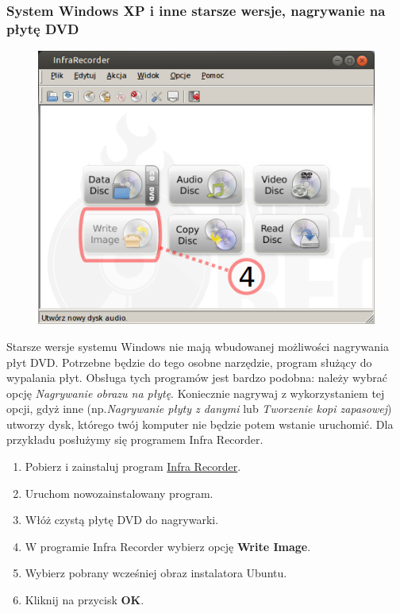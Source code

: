 \subsubsection{System Windows XP i inne starsze wersje, nagrywanie na płytę DVD}
\begin{figure}
		\includegraphics[width=\linewidth]{images/instalacja_nagrywanie_obrazu_DVD_winXP.png}
\end{figure}
Starsze wersje systemu Windows nie mają wbudowanej możliwości nagrywania płyt DVD. Potrzebne będzie do tego osobne narzędzie, program służący do wypalania płyt. Obsługa tych programów jest bardzo podobna: należy wybrać opcję \emph{Nagrywanie obrazu na płytę}. Koniecznie nagrywaj z wykorzystaniem tej opcji, gdyż inne (np.\emph{Nagrywanie płyty z danymi} lub \emph{Tworzenie kopi zapasowej}) utworzy dysk, którego twój komputer nie będzie potem wstanie uruchomić. Dla przykładu posłużymy się programem Infra Recorder.

\begin{enumerate}
\item Pobierz i zainstaluj program \href{http://infrarecorder.org/?page_id=5}{Infra Recorder}.
\item Uruchom nowozainstalowany program.
\item Włóż czystą płytę DVD do nagrywarki.
\item W programie Infra Recorder wybierz opcję \textbf{Write Image}.
\item Wybierz pobrany wcześniej obraz instalatora Ubuntu.
\item Kliknij na przycisk \textbf{OK}.
\end{enumerate}
\clearpage










